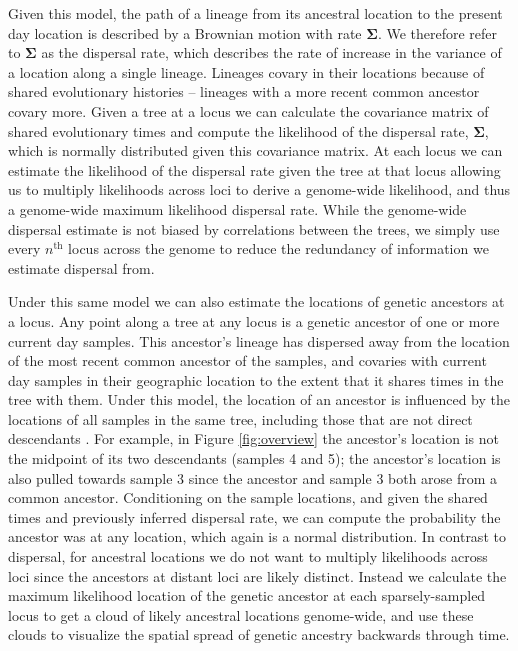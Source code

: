 \documentclass[12pt]{article}
\begin{document}
Given this model, the path of a lineage from its ancestral location to the present day location is described by a Brownian motion with rate $\mathbf{\Sigma}$. We therefore refer to $\mathbf{\Sigma}$ as the dispersal rate, which describes the rate of increase in the variance of a location along a single lineage. Lineages covary in their locations because of shared evolutionary histories -- lineages with a more recent common ancestor covary more. Given a tree at a locus we can calculate the covariance matrix of shared evolutionary times and compute the likelihood of the dispersal rate, $\mathbf{\Sigma}$, which is normally distributed given this covariance matrix. At each locus we can estimate the likelihood of the dispersal rate given the tree at that locus allowing us to multiply likelihoods across loci to derive a genome-wide likelihood, and thus a genome-wide maximum likelihood dispersal rate. While the genome-wide dispersal estimate is not biased by correlations between the trees, we simply use every $n^{\mathrm{th}}$ locus across the genome to reduce the redundancy of information we estimate dispersal from.

Under this same model we can also estimate the locations of genetic ancestors at a locus. Any point along a tree at any locus is a genetic ancestor of one or more current day samples. This ancestor's lineage has dispersed away from the location of the most recent common ancestor of the samples, and covaries with current day samples in their geographic location to the extent that it shares times in the tree with them. Under this model, the location of an ancestor is influenced by the locations of all samples in the same tree, including those that are not direct descendants \citep[cf.][]{wohns2021unified}. For example, in Figure \ref{fig:overview} the ancestor's location is not the midpoint of its two descendants (samples 4 and 5); the ancestor's location is also pulled towards sample 3 since the ancestor and sample 3 both arose from a common ancestor. Conditioning on the sample locations, and given the shared times and previously inferred dispersal rate, we can compute the probability the ancestor was at any location, which again is a normal distribution. In contrast to dispersal, for ancestral locations we do not want to multiply likelihoods across loci since the ancestors at distant loci are likely distinct. Instead we calculate the maximum likelihood location of the genetic ancestor at each sparsely-sampled locus to get a cloud of likely ancestral locations genome-wide, and use these clouds to visualize the spatial spread of genetic ancestry backwards through time.
\end{document}
